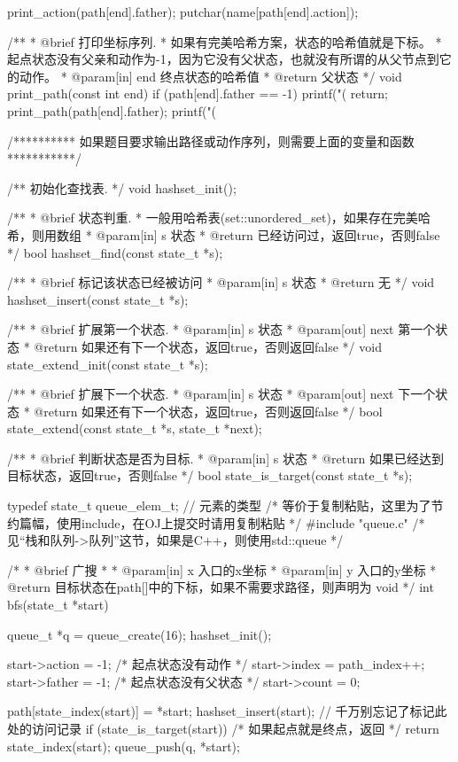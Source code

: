 \begin{Codex}[label=bfs_template.c]
{    print_action(path[end].father);
    putchar(name[path[end].action]);
}

/**
 * @brief 打印坐标序列.
 * 如果有完美哈希方案，状态的哈希值就是下标。
 * 起点状态没有父亲和动作为-1，因为它没有父状态，也就没有所谓的从父节点到它的动作。
 * @param[in] end 终点状态的哈希值
 * @return 父状态
 */
void print_path(const int end) {
    if (path[end].father == -1) {
        printf("(%
        return;
    }
    print_path(path[end].father);
    printf("(%
}

/********** 如果题目要求输出路径或动作序列，则需要上面的变量和函数 ***********/

/** 初始化查找表. */
void hashset_init();

/**
 * @brief 状态判重.
 * 一般用哈希表(set::unordered_set)，如果存在完美哈希，则用数组
 * @param[in] s 状态
 * @return 已经访问过，返回true，否则false
 */
bool hashset_find(const state_t *s);

/**
 * @brief 标记该状态已经被访问
 * @param[in] s 状态
 * @return 无
 */
void hashset_insert(const state_t *s);

/**
 * @brief 扩展第一个状态.
 * @param[in] s 状态
 * @param[out] next 第一个状态
 * @return 如果还有下一个状态，返回true，否则返回false
 */
void state_extend_init(const state_t *s);

/**
 * @brief 扩展下一个状态.
 * @param[in] s 状态
 * @param[out] next 下一个状态
 * @return 如果还有下一个状态，返回true，否则返回false
 */
bool state_extend(const state_t *s, state_t *next);

/**
 * @brief 判断状态是否为目标.
 * @param[in] s 状态
 * @return 如果已经达到目标状态，返回true，否则false
 */
bool state_is_target(const state_t *s);

typedef state_t queue_elem_t; // 元素的类型
/* 等价于复制粘贴，这里为了节约篇幅，使用include，在OJ上提交时请用复制粘贴 */
#include "queue.c"  /* 见“栈和队列->队列”这节，如果是C++，则使用std::queue */

/*
 * @brief 广搜
 *
 * @param[in] x 入口的x坐标
 * @param[in] y 入口的y坐标
 * @return 目标状态在path[]中的下标，如果不需要求路径，则声明为 void
 */
int bfs(state_t *start) {
    queue_t *q = queue_create(16);
    hashset_init();

    start->action = -1;   /* 起点状态没有动作 */
    start->index = path_index++;
    start->father = -1;   /* 起点状态没有父状态 */
    start->count = 0;

    path[state_index(start)] = *start;
    hashset_insert(start); // 千万别忘记了标记此处的访问记录
    if (state_is_target(start)) /* 如果起点就是终点，返回 */
        return state_index(start);
    queue_push(q, *start);

}
\end{Codex}
